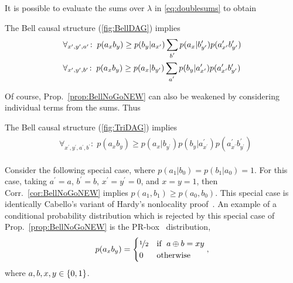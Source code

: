 It is possible to evaluate the sums over $\lambda$ in \cref{eq:doublesums} to obtain
\begin{proposition}\label{prop:BellNoGoNEW}The Bell causal structure (\cref{fig:BellDAG}) implies
\begin{align}\begin{split}
&\forall_{x^{\prime},y^{\prime},a^{\prime}}\!:\;p(a_x b_y)\geq p(b_y|a_{x^{\prime}})\sum\limits_{\mathclap{b^{\prime}}}p(a_x|b^{\prime}_{y^{\prime}})p(a^{\prime}_{x^{\prime}}b^{\prime}_{y^{\prime}})\\
&\forall_{x^{\prime},y^{\prime},b^{\prime}}\!:\;p(a_x b_y)\geq p(a_x|b_{y^{\prime}})\sum\limits_{\mathclap{a^{\prime}}}p(b_y|a^{\prime}_{x^{\prime}})p(a^{\prime}_{x^{\prime}}b^{\prime}_{y^{\prime}})
\end{split}\end{align}
\end{proposition}
Of course, Prop.~\ref{prop:BellNoGoNEW} can also be weakened by considering individual terms from the sums. Thus
\begin{corollary}\label{cor:BellNoGoNEW}The Bell causal structure (\cref{fig:TriDAG}) implies%
\begin{align}\begin{split}
&\forall_{x^{\prime},y^{\prime},a^{\prime},b^{\prime}}\!:\;p(a_x b_y)\geq p(a_x|b_{y^{\prime}})p(b_y|a^{\prime}_{x^{\prime}})p(a^{\prime}_{x^{\prime}}b^{\prime}_{y^{\prime}})
\end{split}\end{align}
\end{corollary}
Consider the following special case, where $p(a_1|b_0)=p(b_1|a_0)=1$. For this case, taking ${a^{\prime}\mathopen{=}a}$, ${b^{\prime}\mathopen{=}b}$, ${x^{\prime}\mathopen{=}y^{\prime}\mathopen{=}0}$, and ${x\mathopen{=}y\mathopen{=}1}$, then Corr.~\ref{cor:BellNoGoNEW} implies $p(a_1,b_1)\geq p(a_0,b_0)$. This special case is identically Cabello's variant of Hardy's nonlocality proof~\cite{L.Hardy:PRL:1665,CabelloHardyInequality,LSW}. 
An example of a conditional probability distribution which is rejected by this special case of Prop.~\ref{prop:BellNoGoNEW} is the PR-box~\cite{PROriginal,PRUnit} distribution,
\begin{align}\label{eq:PRbox}
p(a_x b_y)=\begin{cases}\nicefrac{1}{2}&\text{if }\; a\oplus b= x y \\ 0&\text{otherwise}\end{cases},
\end{align}
where $a,b,x,y\in\lbrace{0,1\rbrace}$.

